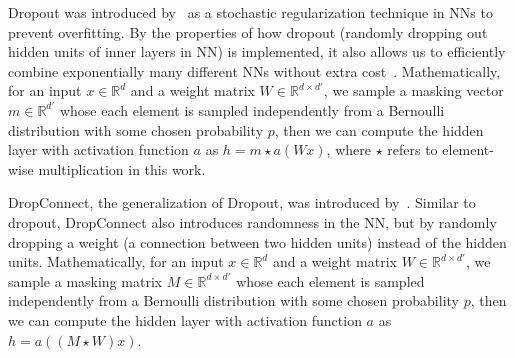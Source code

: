     Dropout was introduced by~\cite{DropoutOG} as a stochastic regularization technique in NNs to prevent overfitting. By the properties of how dropout (randomly dropping out hidden units of inner layers in NN) is implemented, it also allows us to efficiently combine exponentially many different NNs without extra cost~\cite{DropoutOG}. Mathematically, for an input $x \in \mathbb{R}^d$ and a weight matrix $W\in \mathbb{R}^{d \times d'}$, we sample a masking vector $m \in \mathbb{R}^{d'}$ whose each element is sampled independently from a Bernoulli distribution with some chosen probability $p$, then we can compute the hidden layer with activation function $a$ as $h = m \star a(Wx)$, where $\star$ refers to element-wise multiplication in this work.
    \newline

    DropConnect, the generalization of Dropout, was introduced by~\cite{DropConnectOG}. Similar to dropout, DropConnect also introduces randomness in the NN, but by randomly dropping a weight (a connection between two hidden units) instead of the hidden units. Mathematically, for an input $x \in \mathbb{R}^d$ and a weight matrix $W\in \mathbb{R}^{d \times d'}$, we sample a masking matrix $M \in \mathbb{R}^{d \times d'}$ whose each element is sampled independently from a Bernoulli distribution with some chosen probability $p$, then we can compute the hidden layer with activation function $a$ as $h = a((M \star W) x)$.
    \newline


